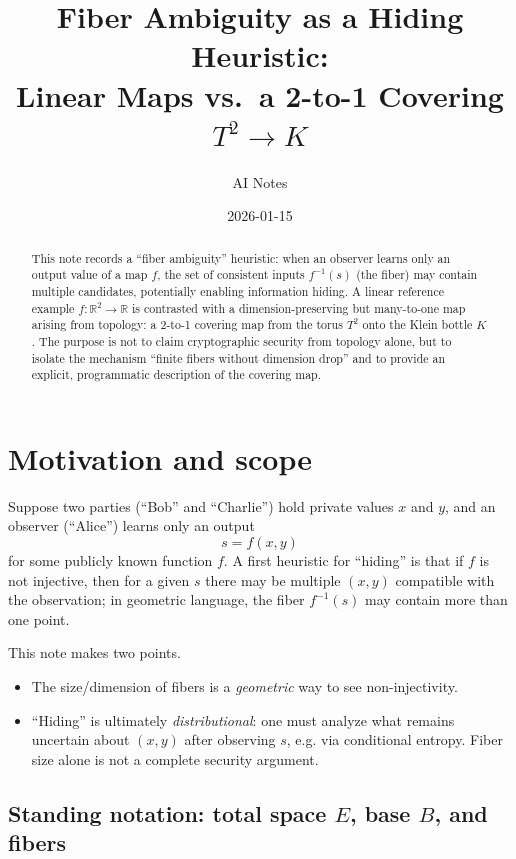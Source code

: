 \documentclass[11pt,a4paper]{article}
\title{Fiber Ambiguity as a Hiding Heuristic:\\
Linear Maps vs.\ a 2-to-1 Covering \(T^2\to K\)}
\author{AI Notes}
\date{2026-01-15}
\theoremstyle{definition}
\theoremstyle{remark}
\begin{document}
\maketitle

\begin{abstract}
This note records a ``fiber ambiguity'' heuristic: when an observer learns only an output value of a map \(f\), the set of consistent inputs \(f^{-1}(s)\) (the fiber) may contain multiple candidates, potentially enabling information hiding. A linear reference example \(f:\mathbb{R}^2\to\mathbb{R}\) is contrasted with a dimension-preserving but many-to-one map arising from topology: a 2-to-1 covering map from the torus \(T^2\) onto the Klein bottle \(K\). The purpose is not to claim cryptographic security from topology alone, but to isolate the mechanism ``finite fibers without dimension drop'' and to provide an explicit, programmatic description of the covering map.
\end{abstract}

\section{Motivation and scope}
\label{sec:motivation}

Suppose two parties (``Bob'' and ``Charlie'') hold private values \(x\) and \(y\), and an observer (``Alice'') learns only an output
\[
s = f(x,y)
\]
for some publicly known function \(f\). A first heuristic for ``hiding'' is that if \(f\) is not injective, then for a given \(s\) there may be multiple \((x,y)\) compatible with the observation; in geometric language, the fiber \(f^{-1}(s)\) may contain more than one point.

This note makes two points.
\begin{itemize}
  \item The size/dimension of fibers is a \emph{geometric} way to see non-injectivity.
  \item ``Hiding'' is ultimately \emph{distributional}: one must analyze what remains uncertain about \((x,y)\) after observing \(s\), e.g. via conditional entropy. Fiber size alone is not a complete security argument.
\end{itemize}

\subsection{Standing notation: total space \(E\), base \(B\), and fibers}
\label{sec:standing-notation}
\end{document}
